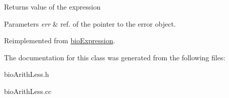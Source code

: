 \begin{DoxyReturn}{Returns}
value of the expression 
\end{DoxyReturn}

\begin{DoxyParams}{Parameters}
{\em err} & ref. of the pointer to the error object. \\
\hline
\end{DoxyParams}


Reimplemented from \hyperlink{classbio_expression_af58662a5d4d456f15bc4f2c9bd4f8a5b}{bio\+Expression}.



The documentation for this class was generated from the following files\+:\begin{DoxyCompactItemize}
\item 
bio\+Arith\+Less.\+h\item 
bio\+Arith\+Less.\+cc\end{DoxyCompactItemize}
